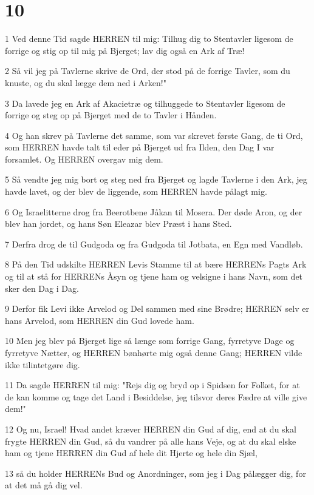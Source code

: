 \chapter{10}

\par 1 Ved denne Tid sagde HERREN til mig: Tilhug dig to Stentavler ligesom de forrige og stig op til mig på Bjerget; lav dig også en Ark af Træ!
\par 2 Så vil jeg på Tavlerne skrive de Ord, der stod på de forrige Tavler, som du knuste, og du skal lægge dem ned i Arken!"
\par 3 Da lavede jeg en Ark af Akacietræ og tilhuggede to Stentavler ligesom de forrige og steg op på Bjerget med de to Tavler i Hånden.
\par 4 Og han skrev på Tavlerne det samme, som var skrevet første Gang, de ti Ord, som HERREN havde talt til eder på Bjerget ud fra Ilden, den Dag I var forsamlet. Og HERREN overgav mig dem.
\par 5 Så vendte jeg mig bort og steg ned fra Bjerget og lagde Tavlerne i den Ark, jeg havde lavet, og der blev de liggende, som HERREN havde pålagt mig.
\par 6 Og Israelitterne drog fra Beerotbene Jåkan til Mosera. Der døde Aron, og der blev han jordet, og hans Søn Eleazar blev Præst i hans Sted.
\par 7 Derfra drog de til Gudgoda og fra Gudgoda til Jotbata, en Egn med Vandløb.
\par 8 På den Tid udskilte HERREN Levis Stamme til at bære HERRENs Pagts Ark og til at stå for HERRENs Åsyn og tjene ham og velsigne i hans Navn, som det sker den Dag i Dag.
\par 9 Derfor fik Levi ikke Arvelod og Del sammen med sine Brødre; HERREN selv er hans Arvelod, som HERREN din Gud lovede ham.
\par 10 Men jeg blev på Bjerget lige så længe som forrige Gang, fyrretyve Dage og fyrretyve Nætter, og HERREN bønhørte mig også denne Gang; HERREN vilde ikke tilintetgøre dig.
\par 11 Da sagde HERREN til mig: "Rejs dig og bryd op i Spidsen for Folket, for at de kan komme og tage det Land i Besiddelse, jeg tilsvor deres Fædre at ville give dem!"
\par 12 Og nu, Israel! Hvad andet kræver HERREN din Gud af dig, end at du skal frygte HERREN din Gud, så du vandrer på alle hans Veje, og at du skal elske ham og tjene HERREN din Gud af hele dit Hjerte og hele din Sjæl,
\par 13 så du holder HERRENs Bud og Anordninger, som jeg i Dag pålægger dig, for at det må gå dig vel.
